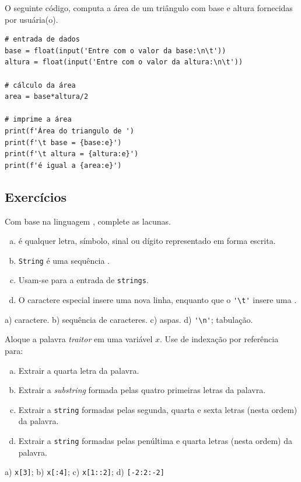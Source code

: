 \begin{ex}
  O seguinte código, computa a área de um triângulo com base e altura fornecidas por usuária(o).

\begin{lstlisting}
# entrada de dados
base = float(input('Entre com o valor da base:\n\t'))
altura = float(input('Entre com o valor da altura:\n\t'))

# cálculo da área
area = base*altura/2

# imprime a área
print(f'Área do triangulo de ')
print(f'\t base = {base:e}')
print(f'\t altura = {altura:e}')
print(f'é igual a {area:e}')
\end{lstlisting}

\end{ex}

\subsection{Exercícios}

\begin{exer}
  Com base na linguagem {\python}, complete as lacunas.
  \begin{enumerate}[a)]
    \item \underline{\phantom{Caractere}} é qualquer letra, símbolo, sinal ou dígito representado em forma escrita.
    \item \texttt{String} é uma sequência \underline{\phantom{caracteres}}.
    \item Usam-se \underline{\phantom{aspas}} para a entrada de \texttt{strings}.
    \item O caractere especial \underline{} insere uma nova linha, enquanto que o \lstinline{'\t'} insere uma \underline{\phantom{tabulação}}.
  \end{enumerate}
\end{exer}
\begin{resp}
  a) caractere. b) sequência de caracteres. c) aspas. d) \lstinline{'\n'}; tabulação.
\end{resp}

\begin{exer}
  Aloque a palavra \textit{traitor} em uma variável $x$. Use de indexação por referência para:
  \begin{enumerate}[a)]
  \item Extrair a quarta letra da palavra.
  \item Extrair a \textit{substring} formada pelas quatro primeiras letras da palavra.
  \item Extrair a \texttt{string} formadas pelas segunda, quarta e sexta letras (nesta ordem) da palavra.
  \item Extrair a \texttt{string} formadas pelas penúltima e quarta letras (nesta ordem) da palavra.
  \end{enumerate}
\end{exer}
\begin{resp}
  a) \lstinline+x[3]+; b) \lstinline+x[:4]+; c) \lstinline+x[1::2]+; d) \lstinline+[-2:2:-2]+
\end{resp}

